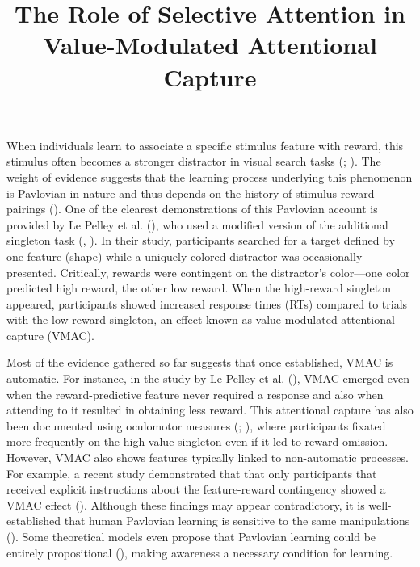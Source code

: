 \documentclass[
  jou,
  floatsintext,
  longtable,
  nolmodern,
  notxfonts,
  notimes,
  colorlinks=true,linkcolor=blue,citecolor=blue,urlcolor=blue]{apa7}
\title{The Role of Selective Attention in Value-Modulated Attentional
Capture}
\begin{document}
\maketitle


\setcounter{secnumdepth}{-\maxdimen} %

\setlength\LTleft{0pt}


When individuals learn to associate a specific stimulus feature with
reward, this stimulus often becomes a stronger distractor in visual
search tasks (;
). The weight of
evidence suggests that the learning process underlying this phenomenon
is Pavlovian in nature and thus depends on the history of
stimulus-reward pairings (). One of the clearest demonstrations of this Pavlovian account is
provided by Le Pelley et al. (), who
used a modified version of the additional singleton task
(,
). In their study, participants
searched for a target defined by one feature (shape) while a uniquely
colored distractor was occasionally presented. Critically, rewards were
contingent on the distractor's color---one color predicted high reward,
the other low reward. When the high-reward singleton appeared,
participants showed increased response times (RTs) compared to trials
with the low-reward singleton, an effect known as value-modulated
attentional capture (VMAC).

Most of the evidence gathered so far suggests that once established,
VMAC is automatic. For instance, in the study by Le Pelley et al.
(), VMAC emerged even when the
reward-predictive feature never required a response and also when
attending to it resulted in obtaining less reward. This attentional
capture has also been documented using oculomotor measures
(;
), where
participants fixated more frequently on the high-value singleton even if
it led to reward omission. However, VMAC also shows features typically
linked to non-automatic processes. For example, a recent study
demonstrated that that only participants that received explicit
instructions about the feature-reward contingency showed a VMAC effect
(). Although these findings may appear contradictory, it is
well-established that human Pavlovian learning is sensitive to the same
manipulations ().
Some theoretical models even propose that Pavlovian learning could be
entirely propositional (), making awareness a necessary condition for learning.
\end{document}
